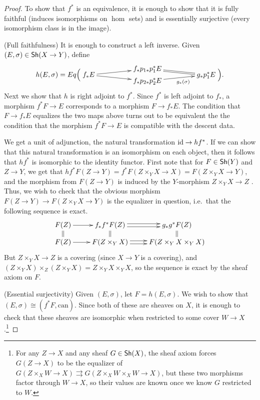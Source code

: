  \begin{proof}
   To show that $f^*$ is an equivalence, it is enough to show that it is fully faithful
   (induces isomorphisms on $\hom$ sets) and is essentially surjective (every isomorphism class
   is in the image).

   (Full faithfulness) It is enough to construct a left inverse. Given $(E,\sigma)\in
   \text{\sf Sh}(X\to Y)$, define
   \[
   h(E,\sigma) =
    Eq\Bigl(
      \raisebox{2ex}{$\xymatrix @!0 @C=7pc @R=2ex  {
        & f_*p_{1*}p_1^*E \ar@{=}[dr] \\
        f_*E \ar[ru] \ar[rd] & & g_* p_1^* E \\
        & f_*p_{2*}p_2^*E \ar[ru]_<>(.6){g_*(\sigma)}
    }$}\Bigr).
   \]
   Next we show that $h$ is right adjoint to $f^*$. Since $f^*$ is left adjoint to $f_*$,
   a morphism $f^*F\to E$ corresponds to a morphism $F\to f_*E$. The condition that $F\to
   f_*E$ equalizes the two maps above turns out to be equivalent the the condition that
   the morphism $f^*F\to E$ is compatible with the descent data. 

   We get a unit of adjunction, the natural transformation $\operatorname{id}\to hf^*$. If we can show
   that this natural transformation is an isomorphism on each object, then it follows
   that $hf^*$ is isomorphic to the identity functor. First note that for $F\in \text{\sf Sh}(Y)$
   and $Z\to Y$, we get that $hf^*F(Z\to Y) = f^*F(Z\times_Y X\to X)=F(Z\times_Y X\to
   Y)$, and the morphism from $F(Z\to Y)$ is induced by the $Y$-morphism $Z\times_Y X\to
   Z$ . Thus, we wish to check that the obvious
   morphism $F(Z\to Y)\to F(Z\times_Y X\to Y)$ is the equalizer in question, i.e.~that
   the following sequence is exact.
   \begin{equation}\label{lec07Eq:sheaf_axiom}
   \xymatrix@R-1.3pc{
    F(Z) \ar[r]\ar@{=}[d] & f_*f^*F(Z) \ar@<.5ex>[r]\ar@<-.5ex>[r]\ar@{=}[d] & g_*g^*F(Z) \ar@{=}[d]\\
    F(Z) \ar[r] & F(Z\times_Y X)\ar@<.5ex>[r]\ar@<-.5ex>[r] & F(Z\times_Y X\times_Y X)
   }\end{equation}
    But $Z\times_Y X\to Z$ is a covering (since $X\to Y$ is a covering), and $(Z\times_Y
   X)\times_Z (Z\times_Y X)=Z\times_Y X\times_Y X$, so the sequence is exact by
   the sheaf axiom on $F$.

   (Essential surjectivity) Given $(E,\sigma)$, let $F = h(E,\sigma)$. We wish to show
   that $(E,\sigma)\cong (f^*F,\textrm{can})$. Since both of these
   are sheaves on $X$, it is enough to check that these sheaves are isomorphic when
   restricted to some cover $W\to X$.\footnote{For any $Z\to X$ and any sheaf $G\in
   \text{\sf Sh}(X)$, the sheaf axiom forces $G(Z\to X)$ to be the equalizer of $G(Z\times_X W\to
   X)\rightrightarrows G(Z\times_X W\times_X W\to X)$, but these two morphisms factor
   through $W\to X$, so their values are known once we know $G$ restricted to $W$.

}
\end{proof}
